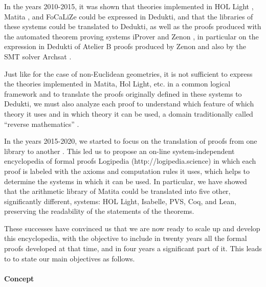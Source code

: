 In the years 2010-2015, it was shown that theories implemented in {\sc
HOL Light} \cite{Assaf12}, {\sc Matita} \cite{Assaf15}, and {\sc
FoCaLiZe} \cite{Cauderlier16} could be expressed in {\sc Dedukti},
and that the libraries of these systems could be translated to {\sc
Dedukti}, as well as the proofs produced with the automated theorem
proving systems {\sc iProver} \cite{Burel10} and {\sc Zenon}
\cite{CauderlierHalmagrand15}, in particular on the expression in {\sc
  Dedukti} of {\sc Atelier B} proofs produced by {\sc Zenon} and also
by the SMT solver {\sc Archsat} \cite{Bury19}.

Just like for the case of non-Euclidean geometries, it is not
sufficient to express the theories implemented in {\sc Matita}, {\sc
  Hol Light}, etc.  in a common logical framework and to translate the
proofs originally defined in these systems to {\sc Dedukti}, we must
also analyze each proof to understand which feature of which theory it
uses and in which theory it can be used, a domain traditionally called
“reverse mathematics” \cite{Friedman76,Simpson09,Dowek17}.


In the years 2015-2020, we started to focus on the translation of
proofs from one library to another \cite{Dowek17,Thire18}. This led us
to propose an on-line system-independent encyclopedia of formal proofs
Logipedia (http://logipedia.science) in which each proof is labeled
with the axioms and computation rules it uses, which helps to
determine the systems in which it can be used. In particular, we have
showed that the arithmetic library of {\sc Matita} could be translated
into five other, significantly different, systems: {\sc HOL Light},
{\sc Isabelle}, {\sc PVS}, {\sc Coq}, and {\sc Lean}, preserving
the readability of the statements of the theorems.

These successes have convinced us that we are now ready to scale up
and develop this encyclopedia, with the objective to include in twenty
years all the formal proofs developed at that time, and in four years a
significant part of it. This leads to to state our main objectives as
follows.

\paragraph{Concept}

